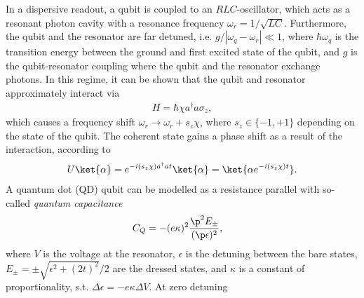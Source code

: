 \documentclass[10pt,a4paper,twoside]{article}
\begin{document}
\begin{multicols}{2}
\begin{figure*}
\label{fig_reflection_coefficient}
\end{figure*}

\par
In a dispersive readout, a qubit is coupled to an $RLC$-oscillator, which acts as a resonant photon cavity with a resonance frequency $\omega_r = 1/\sqrt{LC}$. Furthermore, the qubit and the resonator are far detuned, i.e. $g / |\omega_q - \omega_r| \ll 1$, where $\hbar \omega_q$ is the transition energy between the ground and first excited state of the qubit, and $g$ is the qubit-resonator coupling where the qubit and the resonator exchange photons. In this regime, it can be shown that the qubit and resonator approximately interact via 
\begin{align*}
H = \hbar \chi a^{\dagger} a \sigma_z,
\end{align*}
which causes a frequency shift $\omega_r \to \omega_r + s_z \chi$, where $s_z \in \{ -1,+1 \}$ depending on the state of the qubit. The coherent state gains a phase shift as a result of the interaction, according to 
\begin{align*}
U \ket{\alpha} = e^{ -i (s_z \chi) a^{\dagger} a t } \ket{\alpha} =  \ket{ \alpha e^{- i (s_z \chi) t} }.
\end{align*}
A quantum dot (QD) qubit can be modelled as a resistance parallel with so-called \textit{quantum capacitance} 
\begin{align}
C_Q &= -(e \kappa)^2\frac{ \p^2 E_{\pm} }{ (\p \epsilon)^2 }, \label{eq_C_Q_definition}
\end{align}
where $V$ is the voltage at the resonator, $\epsilon$ is the detuning between the bare states, $E_{\pm} = \pm \sqrt{ \epsilon^2 + (2t)^2 }/2$ are the dressed states, and $\kappa$ is a constant of proportionality, s.t. $\Delta \epsilon = - e \kappa \Delta V$. At zero detuning

\end{multicols}
\end{document}
